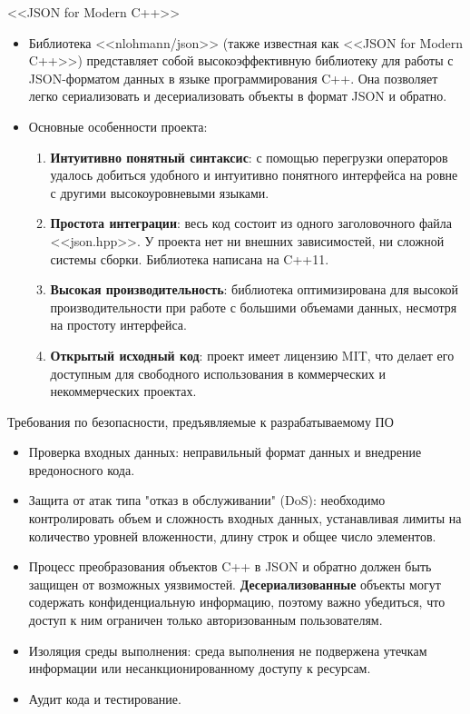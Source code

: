 \documentclass[10pt]{beamer}
\begin{document}
\begin{frame}{<<JSON for Modern C++>>}

    \begin{itemize}
        \item Библиотека <<nlohmann/json>> (также известная как <<JSON for Modern C++>>) представляет собой высокоэффективную библиотеку для работы с JSON-форматом данных в языке программирования C++. Она позволяет легко сериализовать и десериализовать объекты в формат JSON и обратно.

        \item Основные особенности проекта:
        \begin{enumerate}
            \item \textbf{Интуитивно понятный синтаксис}: с помощью перегрузки операторов удалось добиться удобного и интуитивно понятного интерфейса на ровне с другими высокоуровневыми языками.
            \item \textbf{Простота интеграции}: весь код состоит из одного заголовочного файла <<json.hpp>>. У проекта нет ни внешних зависимостей, ни сложной системы сборки. Библиотека написана на C++11.
            \item \textbf{Высокая производительность}: библиотека оптимизирована для высокой производительности при работе с большими объемами данных, несмотря на простоту интерфейса.
           \item \textbf{Открытый исходный код}: проект имеет лицензию MIT, что делает его доступным для свободного использования в коммерческих и некоммерческих проектах.
        \end{enumerate}
    \end{itemize}

\end{frame}

\begin{frame}{Требования по безопасности, предъявляемые к разрабатываемому ПО}
    \begin{itemize}
        \item Проверка входных данных: неправильный формат данных и внедрение вредоносного кода.

        \item Защита от атак типа "отказ в обслуживании" (DoS): необходимо контролировать объем и сложность входных данных, устанавливая лимиты на количество уровней вложенности, длину строк и общее число элементов.

        \item Процесс преобразования объектов C++ в JSON и обратно должен быть защищен от возможных уязвимостей. \textbf{Десериализованные} объекты могут содержать конфиденциальную информацию, поэтому важно убедиться, что доступ к ним ограничен только авторизованным пользователям.

        \item Изоляция среды выполнения: среда выполнения не подвержена утечкам информации или несанкционированному доступу к ресурсам.

        \item Аудит кода и тестирование.
    \end{itemize}
\end{frame}
\end{document}
